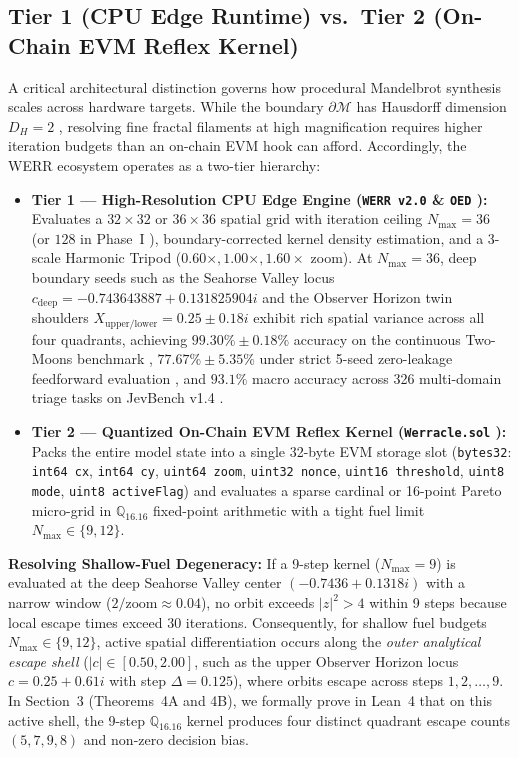 \documentclass[10pt,a4paper]{article}
\begin{document}
\subsection{Tier 1 (CPU Edge Runtime) vs.\ Tier 2 (On-Chain EVM Reflex Kernel)}
A critical architectural distinction governs how procedural Mandelbrot synthesis scales across hardware targets. While the boundary $\partial\mathcal{M}$ has Hausdorff dimension $D_H = 2$ \cite{shishikura1998}, resolving fine fractal filaments at high magnification requires higher iteration budgets than an on-chain EVM hook can afford. Accordingly, the WERR ecosystem operates as a two-tier hierarchy:
\begin{itemize}[leftmargin=1.6em,itemsep=2pt,topsep=2pt]
    \item \textbf{Tier 1 --- High-Resolution CPU Edge Engine (\texttt{WERR v2.0} \& \texttt{OED} \cite{dagli2026oed, dagli2026werr}):} Evaluates a $32 \times 32$ or $36 \times 36$ spatial grid with iteration ceiling $N_{\max} = 36$ (or $128$ in Phase~I \cite{dagli2026mandelbrot}), boundary-corrected kernel density estimation, and a 3-scale Harmonic Tripod ($0.60\times, 1.00\times, 1.60\times$ zoom). At $N_{\max} = 36$, deep boundary seeds such as the Seahorse Valley locus $c_{\text{deep}} = -0.743643887 + 0.131825904i$ and the Observer Horizon twin shoulders $X_{\text{upper/lower}} = 0.25 \pm 0.18i$ exhibit rich spatial variance across all four quadrants, achieving $99.30\% \pm 0.18\%$ accuracy on the continuous Two-Moons benchmark \cite{dagli2026mandelbrot}, $77.67\% \pm 5.35\%$ under strict 5-seed zero-leakage feedforward evaluation \cite{dagli2026oed}, and $93.1\%$ macro accuracy across 326 multi-domain triage tasks on JevBench v1.4 \cite{dagli2026werr}.
    \item \textbf{Tier 2 --- Quantized On-Chain EVM Reflex Kernel (\texttt{Werracle.sol} \cite{dagli2026werracle}):} Packs the entire model state into a single 32-byte EVM storage slot (\texttt{bytes32}: \texttt{int64 cx}, \texttt{int64 cy}, \texttt{uint64 zoom}, \texttt{uint32 nonce}, \texttt{uint16 threshold}, \texttt{uint8 mode}, \texttt{uint8 activeFlag}) and evaluates a sparse cardinal or 16-point Pareto micro-grid in $\mathbb{Q}_{16.16}$ fixed-point arithmetic with a tight fuel limit $N_{\max} \in \{9, 12\}$.
\end{itemize}

\noindent\textbf{Resolving Shallow-Fuel Degeneracy:} If a 9-step kernel ($N_{\max}=9$) is evaluated at the deep Seahorse Valley center $(-0.7436 + 0.1318i)$ with a narrow window ($2/\text{zoom} \approx 0.04$), no orbit exceeds $|z|^2 > 4$ within 9 steps because local escape times exceed $30$ iterations. Consequently, for shallow fuel budgets $N_{\max} \in \{9, 12\}$, active spatial differentiation occurs along the \emph{outer analytical escape shell} ($|c| \in [0.50, 2.00]$, such as the upper Observer Horizon locus $c = 0.25 + 0.61i$ with step $\Delta = 0.125$), where orbits escape across steps $1, 2, \dots, 9$. In Section~3 (Theorems~4A and 4B), we formally prove in Lean~4 that on this active shell, the 9-step $\mathbb{Q}_{16.16}$ kernel produces four distinct quadrant escape counts $(5, 7, 9, 8)$ and non-zero decision bias.
\end{document}
